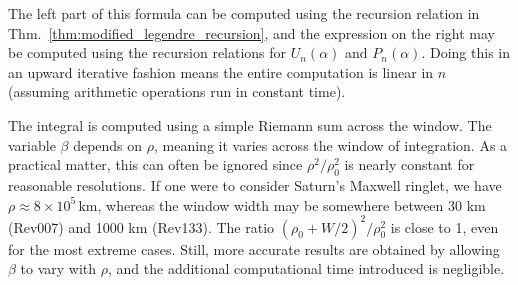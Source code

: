 \documentclass{article}
\theoremstyle{plain}
\begin{document}
        The left part of this formula can be computed using the recursion
        relation in Thm.~\ref{thm:modified_legendre_recursion}, and the
        expression on the right may be computed using the recursion relations
        for $U_{n}(\alpha)$ and $P_{n}(\alpha)$. Doing this in an upward
        iterative fashion means the entire computation is linear in $n$
        (assuming arithmetic operations run in constant time).
        \par\hfill\par
        The integral is computed using a simple Riemann sum across the window.
        The variable $\beta$ depends on $\rho$, meaning it varies across the
        window of integration. As a practical matter, this can often be ignored
        since $\rho^{2}/\rho_{0}^{2}$ is nearly constant for reasonable
        resolutions. If one were to consider Saturn's Maxwell ringlet, we have
        $\rho\approx{8}\times{10}^{5}\,\textrm{km}$, whereas the window width
        may be somewhere between 30 km (Rev007) and 1000 km (Rev133).
        The ratio $(\rho_{0}+W/2)^{2}/\rho_{0}^{2}$ is close to 1, even for
        the most extreme cases. Still, more accurate results are obtained by
        allowing $\beta$ to vary with $\rho$, and the additional computational
        time introduced is negligible.
\end{document}
